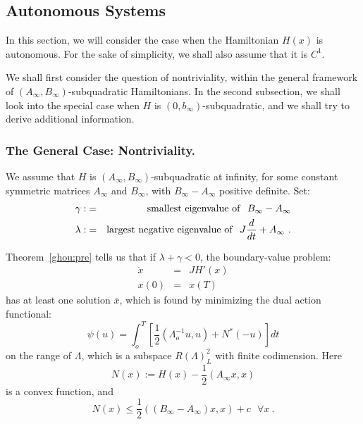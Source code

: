 \documentclass{../styles/svproc}
\begin{document}
%
\subsection{Autonomous Systems}
%
In this section, we will consider the case when the Hamiltonian $H(x)$
is autonomous. For the sake of simplicity, we shall also assume that it
is $C^{1}$.

We shall first consider the question of nontriviality, within the
general framework of
$\left(A_{\infty},B_{\infty}\right)$-subquadratic Hamiltonians. In
the second subsection, we shall look into the special case when $H$ is
$\left(0,b_{\infty}\right)$-subquadratic,
and we shall try to derive additional information.
%
\subsubsection{The General Case: Nontriviality.}
%
We assume that $H$ is
$\left(A_{\infty},B_{\infty}\right)$-sub\-qua\-dra\-tic at infinity,
for some constant symmetric matrices $A_{\infty}$ and $B_{\infty}$,
with $B_{\infty}-A_{\infty}$ positive definite. Set:
\begin{eqnarray}
\gamma :&=&{\rm smallest\ eigenvalue\ of}\ \ B_{\infty} - A_{\infty} \\
  \lambda : &=& {\rm largest\ negative\ eigenvalue\ of}\ \
  J \frac{d}{dt} +A_{\infty}\ .
\end{eqnarray}

Theorem~\ref{ghou:pre} tells us that if $\lambda +\gamma < 0$, the
boundary-value problem:
\begin{equation}
\begin{array}{rcl}
  \dot{x}&=&JH' (x)\\
  x(0)&=&x (T)
\end{array}
\end{equation}
has at least one solution
$\overline{x}$, which is found by minimizing the dual
action functional:
\begin{equation}
  \psi (u) = \int_{o}^{T} \left[\frac{1}{2}
  \left(\Lambda_{o}^{-1} u,u\right) + N^{\ast} (-u)\right] dt
\end{equation}
on the range of $\Lambda$, which is a subspace $R (\Lambda)_{L}^{2}$
with finite codimension. Here
\begin{equation}
  N(x) := H(x) - \frac{1}{2} \left(A_{\infty} x,x\right)
\end{equation}
is a convex function, and
\begin{equation}
  N(x) \le \frac{1}{2}
  \left(\left(B_{\infty} - A_{\infty}\right) x,x\right)
  + c\ \ \ \forall x\ .
\end{equation}
\end{document}
